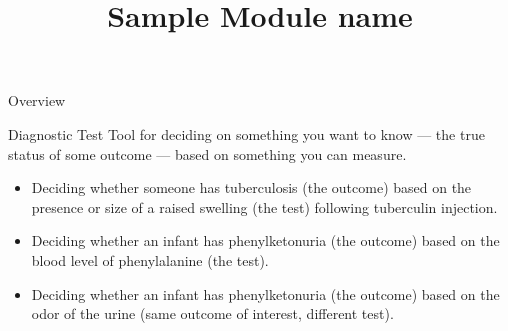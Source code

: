




\title{Sample Module name}

\newcommand{\LicenseText}{These slides were adapted for \href{http://statsteachr.org}{statsTeachR} by Nicholas Reich from slides written by Jeff Goldsmith and are released under a \href{http://creativecommons.org/licenses/by-sa/3.0/deed.en_US}{Creative Commons Attribution-ShareAlike 3.0 Unported License}. }






\begin{frame}[plain]
	\titlepage
\end{frame}






\begin{frame}{Overview}

	\begin{block}{Diagnostic Test}
		Tool for deciding on something you want to know --- the true status of some outcome --- based on something you can measure.

		\begin{itemize}

			\item{Deciding whether someone has tuberculosis (the outcome) based on the presence or size of a raised swelling (the test) following tuberculin injection.}

			\item{Deciding whether an infant has phenylketonuria (the outcome) based on the blood level of phenylalanine (the test).}

			\item{Deciding whether an infant has phenylketonuria (the outcome) based on the odor of the urine (same outcome of interest, different test).}
		\end{itemize}

	\end{block}

\end{frame}



